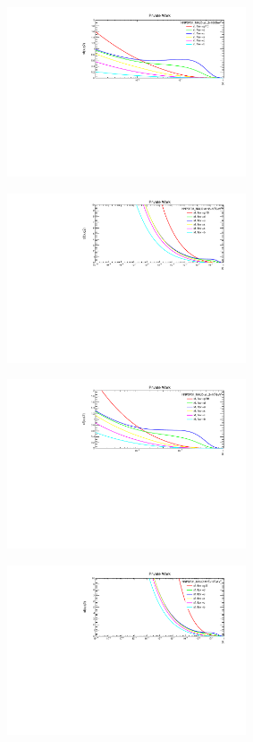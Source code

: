\begin{figure}[H]
\begin{subfigure}{0.45\textwidth}
\vspace*{-8mm}
\caption{}
\end{subfigure}
\begin{subfigure}{0.45\textwidth}
\includegraphics[height=5cm, width=\textwidth]{chapter4/xfx100gev1.pdf}
\vspace*{-8mm}
\caption{}
\end{subfigure}
\begin{subfigure}{0.45\textwidth}
\includegraphics[height=5cm, width=\textwidth]{chapter4/xfx1000gev.pdf}
\vspace*{-8mm}
\caption{}
\end{subfigure}
\begin{subfigure}{0.45\textwidth}
\includegraphics[height=5cm, width=\textwidth]{chapter4/xfx1000gev1.pdf}
\vspace*{-8mm}
\caption{}
\end{subfigure}
\begin{subfigure}{0.45\textwidth}
\includegraphics[height=5cm, width=\textwidth]{chapter4/xfx10000gev.pdf}

\end{subfigure}
\end{figure}
